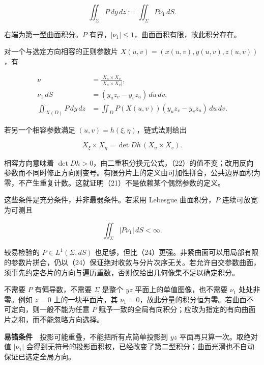 \documentclass[11pt,a4paper]{article}
\begin{document}
\begin{equation}
\iint_\Sigma P\,dy\,dz:=\iint_\Sigma P\nu_1\,dS.
\tag{21}
\end{equation}

右端为第一型曲面积分。\(P\)
有界，\(|\nu_1|\le1\)，曲面面积有限，故此积分存在。

对一个与选定方向相容的正则参数片 \(X(u,v)=(x(u,v),y(u,v),z(u,v))\)，有

\begin{equation}
\begin{aligned}
\nu&=\frac{X_u\times X_v}{|X_u\times X_v|},\\
\nu_1\,dS&=(y_u z_v-y_v z_u)\,du\,dv,\\
\iint_{X(D)}P\,dy\,dz
&=\iint_D P(X(u,v))(y_u z_v-y_v z_u)\,du\,dv.
\end{aligned}
\tag{22}
\end{equation}

若另一个相容参数满足 \((u,v)=h(\xi,\eta)\)，链式法则给出

\begin{equation}
X_\xi\times X_\eta
=\det Dh\,(X_u\times X_v).
\tag{23}
\end{equation}

相容方向意味着
\(\det Dh>0\)，由二重积分换元公式，（22）的值不变；改用反向参数而不同时修正方向则变号。有限分片上的定义由可加性拼合，公共边界面积为零，不产生重复计数。这就证明（21）不是依赖某个偶然参数的定义。

这些条件是充分条件，并非最弱条件。若采用 Lebesgue 曲面积分，\(P\)
连续可放宽为可测且

\begin{equation}
\iint_\Sigma |P\nu_1|\,dS<\infty.
\tag{24}
\end{equation}

较易检验的 \(P\in L^1(\Sigma,dS)\)
也足够，但比（24）更强。非紧曲面可以用局部有限的参数片拼合，仍以（24）保证绝对收敛与分片次序无关。若允许自交参数曲面，须事先约定各片的方向与遍历重数，否则仅给出几何像集不足以确定积分。

不需要 \(P\) 有偏导数，不需要 \(\Sigma\) 是整个 \(yz\)
平面上的单值图像，也不需要 \(\nu_1\) 处处非零。例如 \(z=0\)
上的一块平面片，其
\(\nu_1=0\)，故此分量的积分恒为零。若曲面不可定向，则一般不能为任意
\(P\)
赋予一致的全局有向积分；应改为指定的有向曲面片之和，而不能忽略方向选择。

\textbf{易错条件}　投影可能重叠，不能把所有点简单投影到 \(yz\)
平面再只算一次。取绝对值 \(|\nu_1|\)
会得到无符号的投影面积权，已经改变了第二型积分；曲面光滑也不自动保证已选定全局方向。
\end{document}

